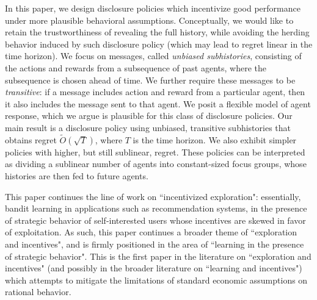 \documentclass[11pt,letterpaper]{article}
\begin{document}
In this paper, we design disclosure policies which incentivize good performance under more plausible behavioral assumptions. Conceptually, we would like to retain the trustworthiness of revealing the full history, while avoiding the herding behavior induced by such disclosure policy (which may lead to regret linear in the time horizon). We focus on messages, called {\em unbiased subhistories}, consisting of the actions and rewards from a subsequence of past agents, where the subsequence is chosen ahead of time. We further require these messages to be \emph{transitive}: if a message includes action and reward from a particular agent, then it also includes the message sent to that agent. We posit a flexible model of agent response, which we argue is plausible for this class of disclosure policies. Our main result is a disclosure policy using unbiased, transitive subhistories that obtains regret $\tilde{O}(\sqrt{T})$, where $T$ is the time horizon.  We also exhibit simpler policies with higher, but still sublinear, regret.  These policies can be interpreted as dividing a sublinear number of agents into constant-sized focus groups, whose histories are then fed to future agents.

\vspace{2mm}

This paper continues the line of work on ``incentivized exploration": essentially, bandit learning in applications such as recommendation systems, in the presence of strategic behavior of self-interested users whose incentives are skewed in favor of exploitation. As such, this paper continues a broader theme of ``exploration and incentives", and is firmly positioned in the area of ``learning in the presence of strategic behavior". This is the first paper in the literature on ``exploration and incentives" (and possibly in the broader literature on ``learning and incentives") which attempts to mitigate the limitations of standard economic assumptions on rational behavior.
\end{document}
